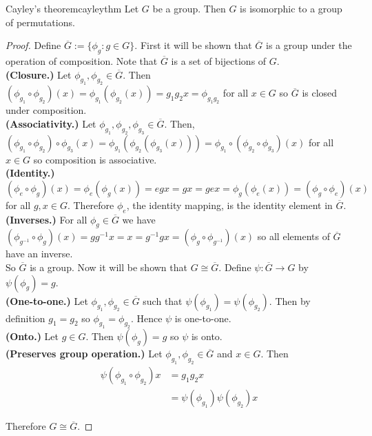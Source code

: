 \documentclass[12pt]{article}
\newcommand{\inv}{^{-1}}
\begin{document}
	\begin{mythm}{Cayley's theorem}{cayleythm}
		Let $G$ be a group. Then $G$ is isomorphic to a group of permutations.
		\begin{proof}
			Define $\overline{G}:=\{\phi_g:g\in G\}$. First it will be shown that $\overline{G}$ is a group under the operation of composition. Note that $\overline{G}$ is a set of bijections of $G$.\\
			
			\textbf{(Closure.)} Let $\phi_{g_1}, \phi_{g_2}\in\overline{G}$. Then $(\phi_{g_1}\circ\phi_{g_2})(x)=\phi_{g_1}(\phi_{g_2}(x))=g_1g_2x=\phi_{g_1g_2}$ for all $x\in G$ so $\overline{G}$ is closed under composition.\\
			
			\textbf{(Associativity.)} Let $\phi_{g_1}, \phi_{g_2}, \phi_{g_3}\in\overline{G}$. Then, $(\phi_{g_1}\circ\phi_{g_2})\circ\phi_{g_3}(x)=\phi_{g_1}(\phi_{g_2}(\phi_{g_3}(x)))=\phi_{g_1}\circ(\phi_{g_2}\circ\phi_{g_3})(x)$ for all $x\in G$ so composition is associative.\\
			
			\textbf{(Identity.)} $(\phi_e\circ\phi_g)(x)=\phi_e(\phi_g(x))=egx=gx=gex=\phi_g(\phi_e(x))=(\phi_g\circ\phi_e)(x)$ for all $g, x\in G$. Therefore $\phi_e$, the identity mapping, is the identity element in $\overline{G}$.\\
			
			\textbf{(Inverses.)} For all $\phi_g\in\overline{G}$ we have $(\phi_{g\inv}\circ\phi_g)(x)=gg\inv x=x=g\inv gx=(\phi_g\circ\phi_{g\inv})(x)$ so all elements of $\overline{G}$ have an inverse.\\
			
			So $\overline{G}$ is a group. Now it will be shown that $G\cong\overline{G}$. Define $\psi:\overline{G}\to G$ by $\psi(\phi_g)=g$.\\
			
			\textbf{(One-to-one.)} Let $\phi_{g_1}, \phi_{g_2}\in\overline{G}$ such that $\psi(\phi_{g_1})=\psi(\phi_{g_2})$. Then by definition $g_1=g_2$ so $\phi_{g_1}=\phi_{g_2}$. Hence $\psi$ is one-to-one.\\
			
			\textbf{(Onto.)} Let $g\in G$. Then $\psi(\phi_g)=g$ so $\psi$ is onto.\\
			
			\textbf{(Preserves group operation.)} Let $\phi_{g_1}, \phi_{g_2}\in\overline{G}$ and $x\in G$. Then
			\begin{align*}
				\psi(\phi_{g_1}\circ\phi_{g_2})x&=g_1g_2x\\
				&=\psi(\phi_{g_1})\psi(\phi_{g_2})x
			\end{align*}
			
			Therefore $G\cong\overline{G}$.
		\end{proof}
	\end{mythm}
	
\end{document}
